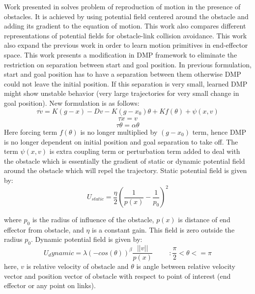 \newline 
Work presented in \cite{park2008movement} solves problem of reproduction of motion in the presence of obstacles. It is achieved by using potential field centered around the obstacle and adding its gradient to the equation of motion. This work also compares different representations of potential fields for obstacle-link collision avoidance. This work also expand the previous work in order to learn motion primitives in end-effector space. This work presents a modification in DMP framework to eliminate the restriction on separation between start and goal position. In previous formulation, start and goal position has to have a separation between them otherwise DMP could not leave the initial position. If this separation is very small, learned DMP might show unstable behavior (very large trajectories for very small change in goal position). 
\newline
New formulation is as follows:
\begin{equation}
	\tau \dot{v} = K(g - x) - Dv - K(g - x_{0})\theta + Kf(\theta) + \psi(x, v)
\end{equation}
\begin{equation}
	\tau \dot{x} = v 
\end{equation}
\begin{equation}
	\tau \dot{\theta} = \alpha \theta 
\end{equation}
Here forcing term $f(\theta)$ is no longer multiplied by $(g - x_{0})$ term, hence DMP is no longer dependent on initial position and goal separation to take off. The term $\psi(x, v)$ is extra coupling term or perturbation term added to deal with the obstacle which is essentially the gradient of static or dynamic potential field around the obstacle which will repel the trajectory. 
\newline
Static potential field is given by:
\begin{equation}
	U_{static} = \frac{\eta}{2}(\frac{1}{p(x)} - \frac{1}{p_{0}})^{2}
\end{equation}

where $p_{0}$ is the radius of influence of the obstacle, $p(x)$ is distance of end effector from obstacle, and $\eta$ is a constant gain. This field is zero outside the radius $p_{0}$.
\newline
Dynamic potential field is given by:
\begin{equation}
	U_dynamic = \lambda(-cos(\theta))^{\beta}\frac{||v||}{p(x)} \hspace{1cm} : \frac{\pi}{2} < \theta <= \pi
\end{equation}
here, $v$ is relative velocity of obstacle and $\theta$ is angle between relative velocity vector and position vector of obstacle with respect to point of interest (end effector or any point on links). 

